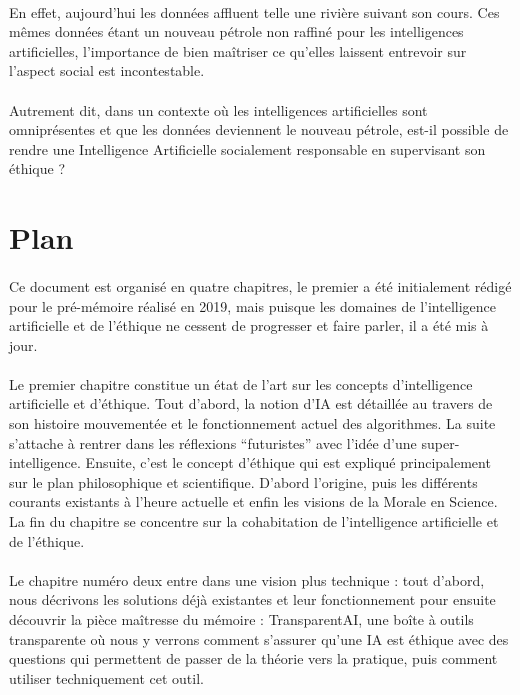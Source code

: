 \documentclass[10pt, french, a4paper]{report}
\begin{document}
\paragraph{}
En effet, aujourd’hui les données affluent telle une rivière suivant son cours. Ces mêmes données étant un nouveau pétrole non raffiné pour les intelligences artificielles, l’importance de bien maîtriser ce qu’elles laissent entrevoir sur l’aspect social est incontestable.

\paragraph{}
Autrement dit, dans un contexte où les intelligences artificielles sont omniprésentes et que les données deviennent le nouveau pétrole, est-il possible de rendre une Intelligence Artificielle socialement responsable en supervisant son éthique ?


\section*{Plan} 

\paragraph{}
Ce document est organisé en quatre chapitres, le premier a été initialement rédigé pour le pré-mémoire réalisé en 2019, mais puisque les domaines de l'intelligence artificielle et de l'éthique ne cessent de progresser et faire parler, il a été mis à jour.

\paragraph{}
Le premier chapitre constitue un état de l’art sur les concepts d’intelligence artificielle et d’éthique. Tout d’abord, la notion d’IA est détaillée au travers de son histoire mouvementée et le fonctionnement actuel des algorithmes. La suite s’attache à rentrer dans les réflexions ``futuristes'' avec l’idée d’une super-intelligence. Ensuite, c’est le concept d’éthique qui est expliqué principalement sur le plan philosophique et scientifique. D’abord l’origine, puis les différents courants existants à l’heure actuelle et enfin les visions de la Morale en Science. La fin du chapitre se concentre sur la cohabitation de l'intelligence artificielle et de l'éthique.

\paragraph{}
Le chapitre numéro deux entre dans une vision plus technique : tout d'abord, nous décrivons les solutions déjà existantes et leur fonctionnement pour ensuite découvrir la pièce maîtresse du mémoire : TransparentAI, une boîte à outils transparente où nous y verrons comment s'assurer qu'une IA est éthique avec des questions qui permettent de passer de la théorie vers la pratique, puis comment utiliser techniquement cet outil.
\end{document}

